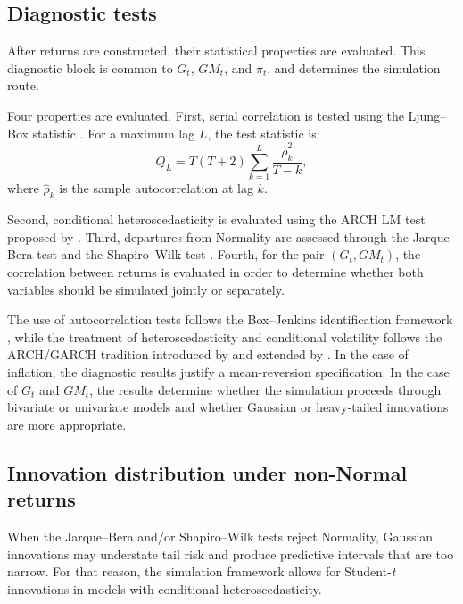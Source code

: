 \documentclass[authoryear,preprint,review,10pt]{elsarticle}
\begin{document}
\subsection{Diagnostic tests}
\label{appendix:diagnostics}

After returns are constructed, their statistical properties are evaluated. This diagnostic block is common to $G_t$, $GM_t$, and $\pi_t$, and determines the simulation route.

Four properties are evaluated. First, serial correlation is tested using the Ljung--Box statistic \citep{ljung1978measure}. For a maximum lag $L$, the test statistic is:
\begin{equation}
    Q_L = T(T+2)\sum_{k=1}^L \frac{\hat \rho_k^2}{T-k},
\end{equation}
where $\hat \rho_k$ is the sample autocorrelation at lag $k$.

Second, conditional heteroscedasticity is evaluated using the ARCH LM test proposed by \citet{engle1982autoregressive}. Third, departures from Normality are assessed through the Jarque--Bera test \citep{jarque1987test} and the Shapiro--Wilk test \citep{shapiro1965analysis}. Fourth, for the pair $(G_t,GM_t)$, the correlation between returns is evaluated in order to determine whether both variables should be simulated jointly or separately.

The use of autocorrelation tests follows the Box--Jenkins identification framework \citep{box2015time}, while the treatment of heteroscedasticity and conditional volatility follows the ARCH/GARCH tradition introduced by \citet{engle1982autoregressive} and extended by \citet{bollerslev1986generalized}. In the case of inflation, the diagnostic results justify a mean-reversion specification. In the case of $G_t$ and $GM_t$, the results determine whether the simulation proceeds through bivariate or univariate models and whether Gaussian or heavy-tailed innovations are more appropriate.

\subsection{Innovation distribution under non-Normal returns}
\label{appendix:innovation_dist}

When the Jarque--Bera \citep{jarque1987test} and/or Shapiro--Wilk \citep{shapiro1965analysis} tests reject Normality, Gaussian innovations may understate tail risk and produce predictive intervals that are too narrow. For that reason, the simulation framework allows for Student-\emph{t} innovations in models with conditional heteroscedasticity.
\end{document}
